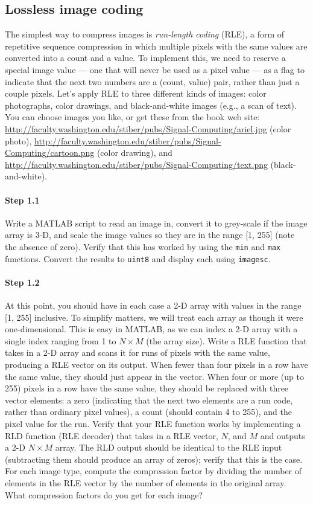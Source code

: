 \subsection{Lossless image coding}

The simplest way to compress images is \emph{run-length coding} (RLE),
a form of repetitive sequence compression in which multiple pixels
with the same values are converted into a count and a value. To
implement this, we need to reserve a special image value --- one that
will never be used as a pixel value --- as a flag to indicate that the
next two numbers are a (count, value) pair, rather than just a couple
pixels. Let's apply RLE to three different kinds of images: color
photographs, color drawings, and black-and-white images (e.g., a scan
of text). You can choose images you like, or get these from the book
web site:
\url{http://faculty.washington.edu/stiber/pubs/Signal-Computing/ariel.jpg}
(color photo),
\url{http://faculty.washington.edu/stiber/pubs/Signal-Computing/cartoon.png}
(color drawing), and
\url{http://faculty.washington.edu/stiber/pubs/Signal-Computing/text.png}
(black-and-white).

\paragraph{Step 1.1} Write a MATLAB script to read an image in,
convert it to grey-scale if the image array is 3-D, and scale the
image values so they are in the range [1, 255] (note the absence of
zero).  Verify that this has worked by using the \verb|min| and
\verb|max| functions. Convert the results to \verb|uint8| and
display each using \verb|imagesc|.

\paragraph{Step 1.2} At this point, you should have in each case a 2-D
array with values in the range [1, 255] inclusive. To simplify
matters, we will treat each array as though it were
one-dimensional. This is easy in MATLAB, as we can index a 2-D array
with a single index ranging from 1 to $N \times M$ (the array
size). Write a RLE function that takes in a 2-D array and scans it for
runs of pixels with the same value, producing a RLE vector on its
output. When fewer than four pixels in a row have the same value, they
should just appear in the vector. When four or more (up to 255) pixels
in a row have the same value, they should be replaced with three
vector elements: a zero (indicating that the next two elements are a
run code, rather than ordinary pixel values), a count (should contain
4 to 255), and the pixel value for the run. Verify that your RLE
function works by implementing a RLD function (RLE decoder) that takes
in a RLE vector, $N$, and $M$ and outputs a 2-D $N \times M$
array. The RLD output should be identical to the RLE input
(subtracting them should produce an array of zeros); verify that this
is the case. For each image type, compute the compression factor by
dividing the number of elements in the RLE vector by the number of
elements in the original array. What compression factors do you get
for each image?

